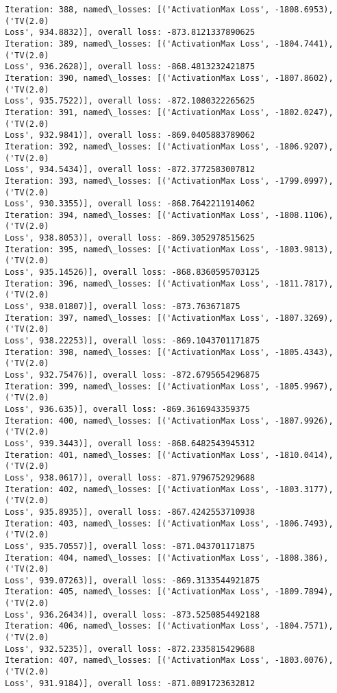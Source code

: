 \documentclass[10pt]{article}
\begin{document}
\begin{Verbatim}[commandchars=\\\{\}]
Iteration: 388, named\_losses: [('ActivationMax Loss', -1808.6953), ('TV(2.0)
Loss', 934.8832)], overall loss: -873.8121337890625
Iteration: 389, named\_losses: [('ActivationMax Loss', -1804.7441), ('TV(2.0)
Loss', 936.2628)], overall loss: -868.4813232421875
Iteration: 390, named\_losses: [('ActivationMax Loss', -1807.8602), ('TV(2.0)
Loss', 935.7522)], overall loss: -872.1080322265625
Iteration: 391, named\_losses: [('ActivationMax Loss', -1802.0247), ('TV(2.0)
Loss', 932.9841)], overall loss: -869.0405883789062
Iteration: 392, named\_losses: [('ActivationMax Loss', -1806.9207), ('TV(2.0)
Loss', 934.5434)], overall loss: -872.3772583007812
Iteration: 393, named\_losses: [('ActivationMax Loss', -1799.0997), ('TV(2.0)
Loss', 930.3355)], overall loss: -868.7642211914062
Iteration: 394, named\_losses: [('ActivationMax Loss', -1808.1106), ('TV(2.0)
Loss', 938.8053)], overall loss: -869.3052978515625
Iteration: 395, named\_losses: [('ActivationMax Loss', -1803.9813), ('TV(2.0)
Loss', 935.14526)], overall loss: -868.8360595703125
Iteration: 396, named\_losses: [('ActivationMax Loss', -1811.7817), ('TV(2.0)
Loss', 938.01807)], overall loss: -873.763671875
Iteration: 397, named\_losses: [('ActivationMax Loss', -1807.3269), ('TV(2.0)
Loss', 938.22253)], overall loss: -869.1043701171875
Iteration: 398, named\_losses: [('ActivationMax Loss', -1805.4343), ('TV(2.0)
Loss', 932.75476)], overall loss: -872.6795654296875
Iteration: 399, named\_losses: [('ActivationMax Loss', -1805.9967), ('TV(2.0)
Loss', 936.635)], overall loss: -869.3616943359375
Iteration: 400, named\_losses: [('ActivationMax Loss', -1807.9926), ('TV(2.0)
Loss', 939.3443)], overall loss: -868.6482543945312
Iteration: 401, named\_losses: [('ActivationMax Loss', -1810.0414), ('TV(2.0)
Loss', 938.0617)], overall loss: -871.9796752929688
Iteration: 402, named\_losses: [('ActivationMax Loss', -1803.3177), ('TV(2.0)
Loss', 935.8935)], overall loss: -867.4242553710938
Iteration: 403, named\_losses: [('ActivationMax Loss', -1806.7493), ('TV(2.0)
Loss', 935.70557)], overall loss: -871.043701171875
Iteration: 404, named\_losses: [('ActivationMax Loss', -1808.386), ('TV(2.0)
Loss', 939.07263)], overall loss: -869.3133544921875
Iteration: 405, named\_losses: [('ActivationMax Loss', -1809.7894), ('TV(2.0)
Loss', 936.26434)], overall loss: -873.5250854492188
Iteration: 406, named\_losses: [('ActivationMax Loss', -1804.7571), ('TV(2.0)
Loss', 932.5235)], overall loss: -872.2335815429688
Iteration: 407, named\_losses: [('ActivationMax Loss', -1803.0076), ('TV(2.0)
Loss', 931.9184)], overall loss: -871.0891723632812

\end{Verbatim}
\end{document}
